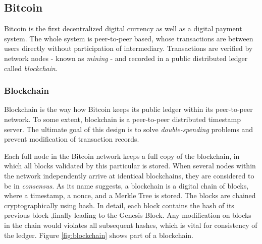 \documentclass[12pt]{article}
\begin{document}
\subsection{Bitcoin}

Bitcoin is the first decentralized digital currency as well as a digital payment system. The whole system is peer-to-peer based, whose transactions are between users directly without participation of intermediary. Transactions are verified by network nodes - known as \textit{mining} - and recorded in a public distributed ledger called \textit{blockchain}.

\subsubsection{Blockchain}

Blockchain is the way how Bitcoin keeps its public ledger within its peer-to-peer network. To some extent, blockchain is a peer-to-peer distributed timestamp server. The ultimate goal of this design is to solve \textit{double-spending} problems and prevent modification of transaction records\cite{nakamoto2008bitcoin}. 

Each full node in the Bitcoin network keeps a full copy of the blockchain, in which all blocks validated by this particular is stored. When several nodes within the network independently arrive at identical blockchains, they are considered to be in \textit{consensus}. As its name suggests, a blockchain is a digital chain of blocks, where a timestamp, a nonce, and a Merkle Tree is stored.  The blocks are chained cryptographically using hash. In detail, each block contains the hash of its previous block ,finally leading to the Genesis Block. Any modification on blocks in the chain would violates all subsequent hashes, which is vital for consistency of the ledger. Figure \ref{fig:blockchain} shows part of a blockchain. 
\end{document}
